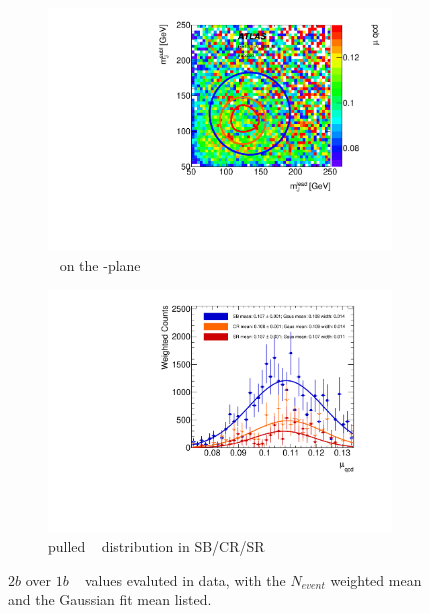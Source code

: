 \begin{figure}[htbp!]
\centering
\captionsetup{justification=centering}
	\hspace{-1cm}
    \begin{subfigure}[b]{0.4\textwidth}
        \includegraphics[width=\textwidth,angle=-90]{figures/boosted/AppendixMuqcdstudy/TwoTag_Incl_mH0H1.pdf}
        \caption{\muqcd~ on the \mleadJ-\msublJ plane}
        \label{fig:app-muqcd-2b-2d}
    \end{subfigure}
    \quad \quad \quad \quad 
    \begin{subfigure}[b]{0.4\textwidth}
        \includegraphics[width=\textwidth,angle=-90]{figures/boosted/AppendixMuqcdstudy/TwoTag_Incl_mH0H1_pull.pdf}
        \caption{pulled \muqcd~ distribution in SB/CR/SR}
        \label{fig:app-muqcd-2b-pull}
    \end{subfigure}
\caption{$2b$ over $1b$ \muqcd~ values evaluted in data, with the $N_{event}$ weighted mean and the Gaussian fit mean listed.}
\label{fig:app-muqcd-2b}
\end{figure}

